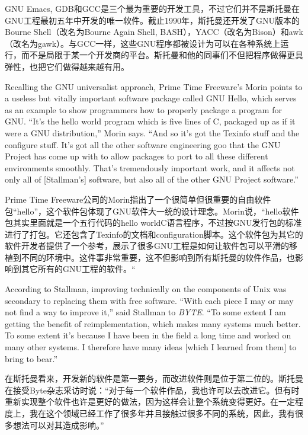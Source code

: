 \ifdefined\chs
GNU Emacs, GDB和GCC是三个最为重要的开发工具，不过它们并不是斯托曼在GNU工程最初五年中开发的唯一软件。截止1990年，斯托曼还开发了GNU版本的Bourne Shell（改名为Bourne Again Shell, BASH），YACC（改名为Bison）和awk（改名为gawk）。与GCC一样，这些GNU程序都被设计为可以在各种系统上运行，而不是局限于某一个开发商的平台。斯托曼和他的同事们不但把程序做得更具弹性，也把它们做得越来越有用。
\fi

\ifdefined\eng
Recalling the GNU universalist approach, Prime Time Freeware's Morin points to a useless but vitally important software package called GNU Hello, which serves as an example to show programmers how to properly package a program for GNU. ``It's the hello world program which is five lines of C, packaged up as if it were a GNU distribution,'' Morin says. ``And so it's got the Texinfo stuff and the configure stuff. It's got all the other software engineering goo that the GNU Project has come up with to allow packages to port to all these different environments smoothly. That's tremendously important work, and it affects not only all of [Stallman's] software, but also all of the other GNU Project software.''
\fi

\ifdefined\chs
Prime Time Freeware公司的Morin指出了一个很简单但很重要的自由软件包``hello''，这个软件包体现了GNU软件大一统的设计理念。Morin说，``hello软件包其实里面就是一个五行代码的hello worldC语言程序，不过按GNU发行包的标准进行了打包。它还包含了Texinfo的文档和configuration脚本。这个软件包为其它的软件开发者提供了一个参考，展示了很多GNU工程是如何让软件包可以平滑的移植到不同的环境中。这件事非常重要，这不但影响到所有斯托曼的软件作品，也影响到其它所有的GNU工程的软件。``
\fi

\ifdefined\eng
According to Stallman, improving technically on the components of Unix was secondary to replacing them with free software. ``With each piece I may or may not find a way to improve it,'' said Stallman to \textit{BYTE}. ``To some extent I am getting the benefit of reimplementation, which makes many systems much better. To some extent it's because I have been in the field a long time and worked on many other systems. I therefore have many ideas [which I learned from them] to bring to bear.''
\fi

\ifdefined\chs
在斯托曼看来，开发新的软件是第一要务，而改进软件则是位于第二位的。斯托曼在接受Byte杂志采访时说：``对于每一个软件作品，我也许可以去改进它。但有时重新实现整个软件也许是更好的做法，因为这样会让整个系统变得更好。在一定程度上，我在这个领域已经工作了很多年并且接触过很多不同的系统，因此，我有很多想法可以对其造成影响。''
\fi

